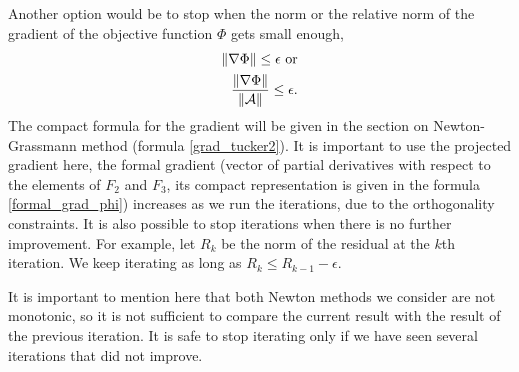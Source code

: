 Another option would be to stop when the norm or the relative norm of the gradient of the objective
function $\Phi$ gets small enough,
\begin{eqnarray}
    \| \nabla \Phi \| \leq \epsilon \mbox{ or}\\
    \frac{ \| \nabla \Phi \|  }{\| \mathcal{A} \| } \leq \epsilon.
\end{eqnarray} 
The compact formula for the gradient will be given in the section on Newton-Grassmann
method (formula \eqref{grad_tucker2}). It is important to use the projected
gradient here, the formal gradient (vector of partial
derivatives with respect to the elements of $F_2$ and $F_3$, its compact
representation is given in the formula \eqref{formal_grad_phi})
increases as we run the iterations, due to the 
orthogonality constraints.
It is also possible to stop iterations when there is no further improvement. 
For example, let $R_k$ be the norm of the residual
at the {$k$th} iteration. We keep iterating as long as  $R_k \leq R_{k-1} - \epsilon$.



It is important to mention here that both Newton methods we consider
are not monotonic, so it is not sufficient to compare the current result
with the result of the previous iteration. It is safe to stop
iterating only if we have seen several iterations that did not improve.
